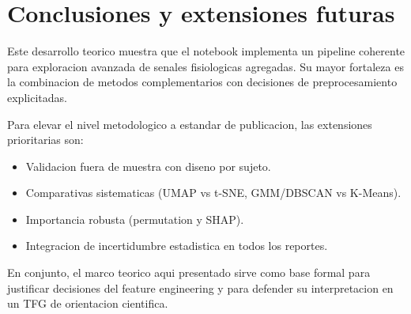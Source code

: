\documentclass[12pt,a4paper,oneside]{report}
\begin{document}
\chapter{Conclusiones y extensiones futuras}

Este desarrollo teorico muestra que el notebook implementa un pipeline coherente para exploracion avanzada de senales fisiologicas agregadas. Su mayor fortaleza es la combinacion de metodos complementarios con decisiones de preprocesamiento explicitadas.

Para elevar el nivel metodologico a estandar de publicacion, las extensiones prioritarias son:
\begin{itemize}
\item Validacion fuera de muestra con diseno por sujeto.
\item Comparativas sistematicas (UMAP vs t-SNE, GMM/DBSCAN vs K-Means).
\item Importancia robusta (permutation y SHAP).
\item Integracion de incertidumbre estadistica en todos los reportes.
\end{itemize}

En conjunto, el marco teorico aqui presentado sirve como base formal para justificar decisiones del feature engineering y para defender su interpretacion en un TFG de orientacion cientifica.



\end{document}
